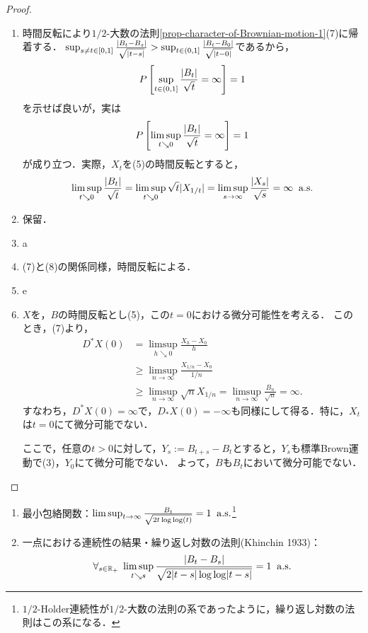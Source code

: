 \documentclass[uplatex,dvipdfmx]{jsreport}
\begin{document}
\begin{proof}\mbox{}
    \begin{enumerate}
        \item 時間反転により$1/2$-大数の法則\ref{prop-character-of-Brownian-motion-1}(7)に帰着する．
        $\sup_{s\ne t\in[0,1]}\frac{\lvert B_t-B_s\rvert}{\sqrt{\lvert t-s\rvert}}>\sup_{t\in(0,1]}\frac{\lvert B_t-B_0\rvert}{\sqrt{\lvert t-0\rvert}}$であるから，
        \[P\left[\sup_{t\in(0,1]}\frac{\lvert B_t\rvert}{\sqrt{t}}=\infty\right]=1\]
        を示せば良いが，実は
        \[P\left[\limsup_{t\searrow0}\frac{\lvert B_t\rvert}{\sqrt{t}}=\infty\right]=1\]
        が成り立つ．実際，$X_t$を(5)の時間反転とすると，
        \[\limsup_{t\searrow0}\frac{\lvert B_t\rvert}{\sqrt{t}}=\limsup_{t\searrow0}\sqrt{t}\lvert X_{1/t}\rvert=\limsup_{s\to\infty}\frac{\lvert X_s\rvert}{\sqrt{s}}=\infty\;\;\mathrm{a.s.}\]
        \item 保留．
        \item a
        \item (7)と(8)の関係同様，時間反転による．
        \item e
        \item $X$を，$B$の時間反転とし(5)，この$t=0$における微分可能性を考える．
        このとき，(7)より，
        \begin{align*}
            D^*X(0)&=\limsup_{h\searrow0}\frac{X_h-X_0}{h}\\
            &\ge\limsup_{n\to\infty}\frac{X_{1/n}-X_0}{1/n}\\
            &\ge\limsup_{n\to\infty}\sqrt{n}X_{1/n}=\limsup_{n\to\infty}\frac{B_n}{\sqrt{n}}=\infty.
        \end{align*}
        すなわち，$D^*X(0)=\infty$で，$D_*X(0)=-\infty$も同様にして得る．特に，$X_t$は$t=0$にて微分可能でない．
        
        ここで，任意の$t>0$に対して，$Y_s:=B_{t+s}-B_t$とすると，$Y_s$も標準Brown運動で(3)，$Y_0$にて微分可能でない．
        よって，$B$も$B_t$において微分可能でない．
    \end{enumerate}
\end{proof}

\begin{proposition}\mbox{}
    \begin{enumerate}
        \item 最小包絡関数：$\limsup_{t\to\infty}\frac{B_t}{\sqrt{2t\log\log(t)}}=1\;\;\mathrm{a.s.}$\footnote{$1/2$-Holder連続性が$1/2$-大数の法則の系であったように，繰り返し対数の法則はこの系になる．}
        \item 一点における連続性の結果・繰り返し対数の法則(Khinchin 1933)：\[\forall_{s\in\mathbb{R}_+}\;\limsup_{t\searrow s}\frac{\lvert B_t-B_s\rvert}{\sqrt{2\lvert t-s\rvert\log\log\lvert t-s\rvert}}=1\;\;\mathrm{a.s.}\]
    \end{enumerate}
\end{proposition}
\end{document}
